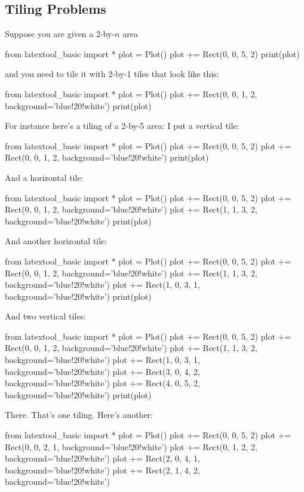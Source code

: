 \subsection{Tiling Problems}

\begin{eg}
Suppose you are given a 2-by-$n$ area
\begin{python}
from latextool_basic import *
plot = Plot()
plot += Rect(0, 0, 5, 2)
print(plot)
\end{python}
and you need to tile it with 2-by-1 tiles that look like this:
\begin{python}
from latextool_basic import *
plot = Plot()
plot += Rect(0, 0, 1, 2, background='blue!20!white')
print(plot)
\end{python}
For instance here's a tiling of a 2-by-5 area:
I put a vertical tile:
\begin{python}
from latextool_basic import *
plot = Plot()
plot += Rect(0, 0, 5, 2)
plot += Rect(0, 0, 1, 2, background='blue!20!white')
print(plot)
\end{python}
And a horizontal tile:
\begin{python}
from latextool_basic import *
plot = Plot()
plot += Rect(0, 0, 5, 2)
plot += Rect(0, 0, 1, 2, background='blue!20!white')
plot += Rect(1, 1, 3, 2, background='blue!20!white')
print(plot)
\end{python}
And another horizontal tile:
\begin{python}
from latextool_basic import *
plot = Plot()
plot += Rect(0, 0, 5, 2)
plot += Rect(0, 0, 1, 2, background='blue!20!white')
plot += Rect(1, 1, 3, 2, background='blue!20!white')
plot += Rect(1, 0, 3, 1, background='blue!20!white')
print(plot)
\end{python}
And two vertical tiles:
\begin{python}
from latextool_basic import *
plot = Plot()
plot += Rect(0, 0, 5, 2)
plot += Rect(0, 0, 1, 2, background='blue!20!white')
plot += Rect(1, 1, 3, 2, background='blue!20!white')
plot += Rect(1, 0, 3, 1, background='blue!20!white')
plot += Rect(3, 0, 4, 2, background='blue!20!white')
plot += Rect(4, 0, 5, 2, background='blue!20!white')
print(plot)
\end{python}
There. That's one tiling. Here's another:
\begin{python}
from latextool_basic import *
plot = Plot()
plot += Rect(0, 0, 5, 2)
plot += Rect(0, 0, 2, 1, background='blue!20!white')
plot += Rect(0, 1, 2, 2, background='blue!20!white')
plot += Rect(2, 0, 4, 1, background='blue!20!white')
plot += Rect(2, 1, 4, 2, background='blue!20!white')

\end{python}
\end{eg}
